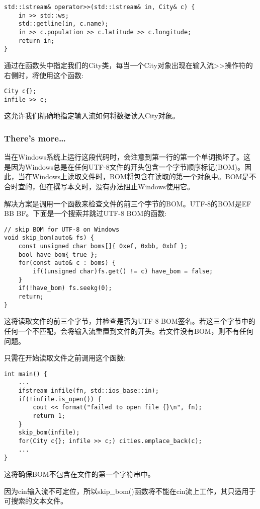 \begin{lstlisting}[style=styleCXX]
std::istream& operator>>(std::istream& in, City& c) {
	in >> std::ws;
	std::getline(in, c.name);
	in >> c.population >> c.latitude >> c.longitude;
	return in;
}
\end{lstlisting}

通过在函数头中指定我们的City类，每当一个City对象出现在输入流>{}>操作符的右侧时，将使用这个函数:

\begin{lstlisting}[style=styleCXX]
City c{};
infile >> c;
\end{lstlisting}

这允许我们精确地指定输入流如何将数据读入City对象。

\subsubsection{There's more…}

当在Windows系统上运行这段代码时，会注意到第一行的第一个单词损坏了。这是因为Windows总是在任何UTF-8文件的开头包含一个字节顺序标记(BOM)。因此，当在Windows上读取文件时，BOM将包含在读取的第一个对象中。BOM是不合时宜的，但在撰写本文时，没有办法阻止Windows使用它。

解决方案是调用一个函数来检查文件的前三个字节的BOM。UTF-8的BOM是EF BB BF。下面是一个搜索并跳过UTF-8 BOM的函数:

\begin{lstlisting}[style=styleCXX]
// skip BOM for UTF-8 on Windows
void skip_bom(auto& fs) {
	const unsigned char boms[]{ 0xef, 0xbb, 0xbf };
	bool have_bom{ true };
	for(const auto& c : boms) {
		if((unsigned char)fs.get() != c) have_bom = false;
	}
	if(!have_bom) fs.seekg(0);
	return;
}
\end{lstlisting}

这将读取文件的前三个字节，并检查是否为UTF-8 BOM签名。若这三个字节中的任何一个不匹配，会将输入流重置到文件的开头。若文件没有BOM，则不有任何问题。

只需在开始读取文件之前调用这个函数:

\begin{lstlisting}[style=styleCXX]
int main() {
	...
	ifstream infile(fn, std::ios_base::in);
	if(!infile.is_open()) {
		cout << format("failed to open file {}\n", fn);
		return 1;
	}
	skip_bom(infile);
	for(City c{}; infile >> c;) cities.emplace_back(c);
	...
}
\end{lstlisting}

这将确保BOM不包含在文件的第一个字符串中。

\begin{tcolorbox}[colback=webgreen!5!white,colframe=webgreen!75!black,title=Note]
因为cin输入流不可定位，所以skip\_bom()函数将不能在cin流上工作，其只适用于可搜索的文本文件。
\end{tcolorbox}











